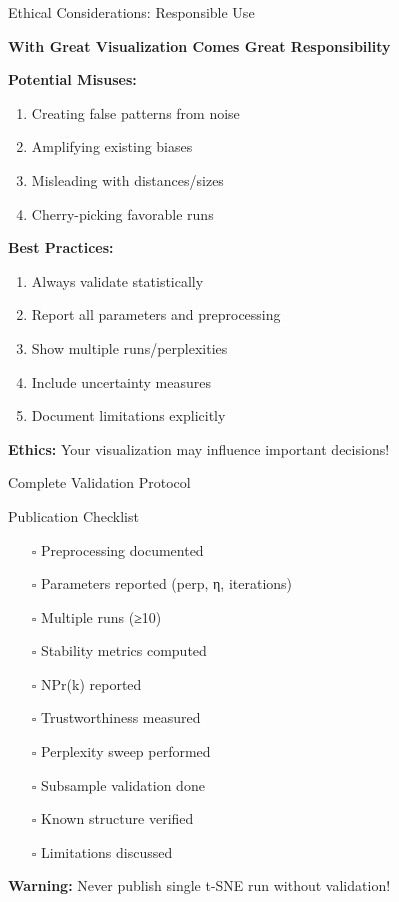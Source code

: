 \documentclass[aspectratio=169]{beamer}
\newcommand{\warning}[1]{\colorbox{red!10}{\textcolor{warningcolor}{\textbf{Warning:} #1}}}
\newcommand{\ethics}[1]{\colorbox{purple!10}{\textcolor{ethicscolor}{\textbf{Ethics:} #1}}}
\begin{document}
\begin{frame}{Ethical Considerations: Responsible Use}
\begin{center}
\colorbox{red!30}{\Large\textbf{With Great Visualization Comes Great Responsibility}}
\end{center}

\textbf{Potential Misuses:}
\begin{enumerate}
\item Creating false patterns from noise
\item Amplifying existing biases
\item Misleading with distances/sizes
\item Cherry-picking favorable runs
\end{enumerate}

\textbf{Best Practices:}
\begin{enumerate}
\item Always validate statistically
\item Report all parameters and preprocessing
\item Show multiple runs/perplexities
\item Include uncertainty measures
\item Document limitations explicitly
\end{enumerate}

\ethics{Your visualization may influence important decisions!}
\end{frame}

\begin{frame}{Complete Validation Protocol}
\begin{block}{Publication Checklist}
\begin{enumerate}
\item[$\square$] Preprocessing documented
\item[$\square$] Parameters reported (perp, η, iterations)
\item[$\square$] Multiple runs (≥10)
\item[$\square$] Stability metrics computed
\item[$\square$] NPr(k) reported
\item[$\square$] Trustworthiness measured
\item[$\square$] Perplexity sweep performed
\item[$\square$] Subsample validation done
\item[$\square$] Known structure verified
\item[$\square$] Limitations discussed
\end{enumerate}
\end{block}

\warning{Never publish single t-SNE run without validation!}
\end{frame}
\end{document}
